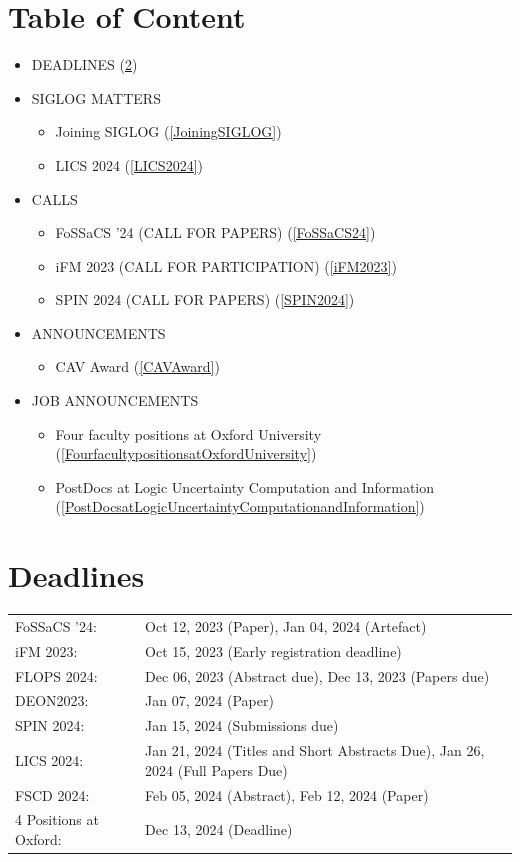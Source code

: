 \documentclass[prodmode,acmtecs]{acmsmall} %
\begin{document}
\section{Table of Content}\begin{itemize}\item DEADLINES (\cref{deadlines}) 
 
\item SIGLOG MATTERS 
 
\begin{itemize}\item Joining SIGLOG (\cref{JoiningSIGLOG})
\item LICS 2024 (\cref{LICS2024})
\end{itemize} 
\item CALLS 
 
\begin{itemize}\item FoSSaCS '24 (CALL FOR PAPERS) (\cref{FoSSaCS24})
\item iFM 2023 (CALL FOR PARTICIPATION) (\cref{iFM2023})
\item SPIN 2024 (CALL FOR PAPERS) (\cref{SPIN2024})
\end{itemize} 
\item ANNOUNCEMENTS 
 
\begin{itemize}\item CAV Award (\cref{CAVAward})
\end{itemize} 
\item JOB ANNOUNCEMENTS 
 
\begin{itemize}\item Four faculty positions at Oxford University (\cref{FourfacultypositionsatOxfordUniversity})
\item PostDocs at Logic Uncertainty Computation and Information (\cref{PostDocsatLogicUncertaintyComputationandInformation})
\end{itemize} 
\end{itemize}\section{Deadlines}\label{deadlines}\begin{tabulary}{\linewidth}{LL}FoSSaCS '24:  & Oct 12, 2023 (Paper), Jan 04, 2024 (Artefact) \\
iFM 2023:  & Oct 15, 2023 (Early registration deadline) \\
FLOPS 2024:  & Dec 06, 2023 (Abstract due), Dec 13, 2023 (Papers due) \\
DEON2023:  & Jan 07, 2024 (Paper) \\
SPIN 2024:  & Jan 15, 2024 (Submissions due) \\
LICS 2024:  & Jan 21, 2024 (Titles and Short Abstracts Due), Jan 26, 2024 (Full Papers Due) \\
FSCD 2024:  & Feb 05, 2024 (Abstract), Feb 12, 2024 (Paper) \\
4 Positions at Oxford:  & Dec 13, 2024 (Deadline) \\
\end{tabulary}
\end{document}
